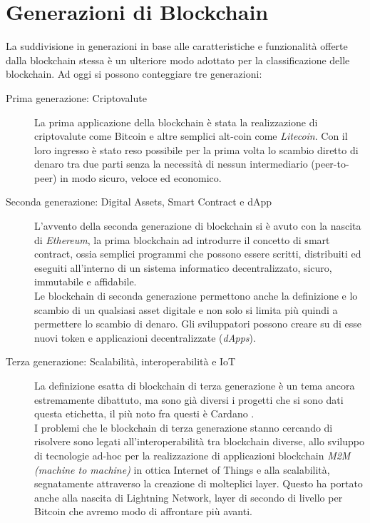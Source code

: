 \section{Generazioni di Blockchain}
La suddivisione in generazioni in base alle caratteristiche e funzionalità offerte dalla blockchain stessa è un ulteriore modo adottato per la classificazione delle blockchain. Ad oggi si possono conteggiare tre generazioni:
\begin{description}
  \item[Prima generazione: Criptovalute] La prima applicazione della blockchain è stata la realizzazione di criptovalute come Bitcoin e altre semplici alt-coin come \textit{Litecoin}. Con il loro ingresso è stato reso possibile per la prima volta lo scambio diretto di denaro tra due parti senza la necessità di nessun intermediario (peer-to-peer) in modo sicuro, veloce ed economico.
  \item[Seconda generazione: Digital Assets, Smart Contract e dApp] L'avvento della seconda generazione di blockchain si è avuto con la nascita di \textit{Ethereum}, la prima blockchain ad introdurre il concetto di smart contract, ossia semplici programmi che possono essere scritti, distribuiti ed eseguiti all'interno di un sistema informatico decentralizzato, sicuro, immutabile e affidabile.\\Le blockchain di seconda generazione permettono anche la definizione e lo scambio di un qualsiasi asset digitale e non solo si limita più quindi a permettere lo scambio di denaro. Gli sviluppatori possono creare su di esse nuovi token e applicazioni decentralizzate (\textit{dApps}).
  \item[Terza generazione: Scalabilità, interoperabilità e IoT] La definizione esatta di blockchain di terza generazione è un tema ancora estremamente dibattuto, ma sono già diversi i progetti che si sono dati questa etichetta, il più noto fra questi è Cardano \cite{conor_2021}.\\I problemi che le blockchain di terza generazione stanno cercando di risolvere sono legati all'interoperabilità tra blockchain diverse, allo sviluppo di tecnologie ad-hoc per la realizzazione di applicazioni blockchain \textit{M2M (machine to machine)} in ottica Internet of Things e alla scalabilità, segnatamente attraverso la creazione di molteplici layer. Questo ha portato anche alla nascita di Lightning Network, layer di secondo di livello per Bitcoin che avremo modo di affrontare più avanti.
\end{description}